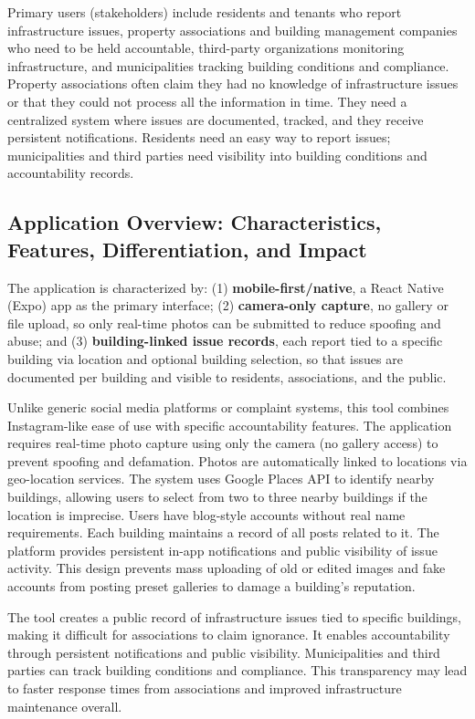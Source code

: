 \documentclass[12pt]{article}
\begin{document}
Primary users (stakeholders) include residents and tenants who report infrastructure issues, property associations and building management companies who need to be held accountable, third-party organizations monitoring infrastructure, and municipalities tracking building conditions and compliance. Property associations often claim they had no knowledge of infrastructure issues or that they could not process all the information in time. They need a centralized system where issues are documented, tracked, and they receive persistent notifications. Residents need an easy way to report issues; municipalities and third parties need visibility into building conditions and accountability records.

\subsection{Application Overview: Characteristics, Features, Differentiation, and Impact}

The application is characterized by: (1) \textbf{mobile-first/native}, a React Native (Expo) app as the primary interface; (2) \textbf{camera-only capture}, no gallery or file upload, so only real-time photos can be submitted to reduce spoofing and abuse; and (3) \textbf{building-linked issue records}, each report tied to a specific building via location and optional building selection, so that issues are documented per building and visible to residents, associations, and the public.

Unlike generic social media platforms or complaint systems, this tool combines Instagram-like ease of use with specific accountability features. The application requires real-time photo capture using only the camera (no gallery access) to prevent spoofing and defamation. Photos are automatically linked to locations via geo-location services. The system uses Google Places API to identify nearby buildings, allowing users to select from two to three nearby buildings if the location is imprecise. Users have blog-style accounts without real name requirements. Each building maintains a record of all posts related to it. The platform provides persistent in-app notifications and public visibility of issue activity. This design prevents mass uploading of old or edited images and fake accounts from posting preset galleries to damage a building's reputation.

The tool creates a public record of infrastructure issues tied to specific buildings, making it difficult for associations to claim ignorance. It enables accountability through persistent notifications and public visibility. Municipalities and third parties can track building conditions and compliance. This transparency may lead to faster response times from associations and improved infrastructure maintenance overall.
\end{document}
